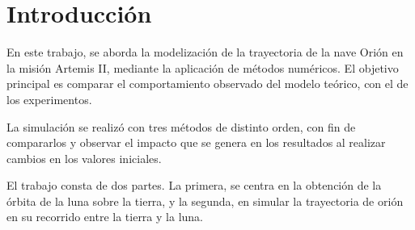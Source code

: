 \section{Introducción}
En este trabajo, se aborda la modelización de la trayectoria de la nave Orión en la misión Artemis II, mediante la aplicación de métodos numéricos. El objetivo principal es comparar el comportamiento observado del modelo teórico, con el de los experimentos. 

La simulación se realizó con tres métodos de distinto orden, con fin de compararlos y observar el impacto que se genera en los resultados al realizar cambios en los valores iniciales.

El trabajo consta de dos partes. La primera, se centra en la obtención de la órbita de la luna sobre la tierra, y la segunda, en simular la trayectoria de orión en su recorrido entre la tierra y la luna.